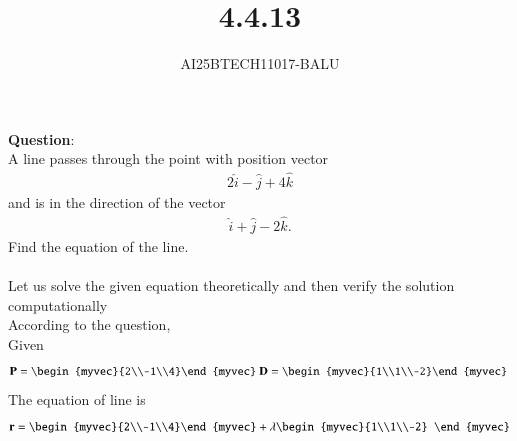 \documentclass[journal]{IEEEtran}
\begin{document}

\vspace{3cm}

\title{4.4.13}
\author{AI25BTECH11017-BALU}
 \maketitle
{\let\newpage\relax\maketitle}
\renewcommand{\thefigure}{\theenumi}
\renewcommand{\thetable}{\theenumi}
\setlength{\intextsep}{10pt} %
\renewcommand{\thetable}{\theenumi}
\textbf{Question}:\\
A line passes through the point with position vector 
\begin{align}
2\hat{i} - \hat{j} + 4\hat{k}
\end{align}
and is in the direction of the vector 
\begin{align}
\hat{i} + \hat{j} - 2\hat{k}.
\end{align}
Find the equation of the line.\\
\solution \\
Let us solve the given equation theoretically and then verify the solution computationally \\
According to the question, \\
Given\\
\begin{align}
\vec{P}=\begin{myvec}{2\\-1\\4}\end{myvec}\
\vec{D}=\begin{myvec}{1\\1\\-2}\end{myvec}\
\end{align}
The equation of line is
   \begin{align}
 \vec{r}=\begin{myvec}{2\\-1\\4}\end{myvec}+\lambda\begin{myvec}{1\\1\\-2}
 \end{myvec}
\end{align}
\end{document}
